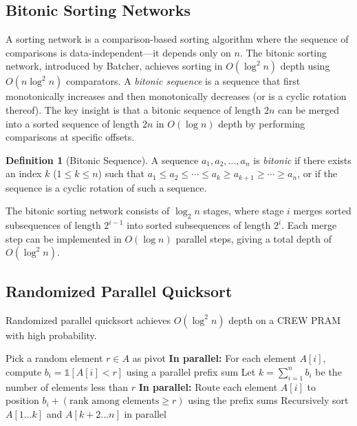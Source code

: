 \documentclass[twoside,12pt]{book}
\theoremstyle{plain}
\theoremstyle{definition}
\newtheorem{definition}[theorem]{Definition}
\theoremstyle{remark}
\begin{document}
\subsection{Bitonic Sorting Networks}
\label{subsec:bitonic}

A sorting network is a comparison-based sorting algorithm where the sequence of comparisons is data-independent---it depends only on $n$. The bitonic sorting network, introduced by Batcher, achieves sorting in $O(\log^2 n)$ depth using $O(n \log^2 n)$ comparators. A \emph{bitonic sequence} is a sequence that first monotonically increases and then monotonically decreases (or is a cyclic rotation thereof). The key insight is that a bitonic sequence of length $2n$ can be merged into a sorted sequence of length $2n$ in $O(\log n)$ depth by performing comparisons at specific offsets.

\begin{definition}[Bitonic Sequence]
\label{def:bitonic}
A sequence $a_1, a_2, \ldots, a_n$ is \emph{bitonic} if there exists an index $k$ ($1 \leq k \leq n$) such that $a_1 \leq a_2 \leq \cdots \leq a_k \geq a_{k+1} \geq \cdots \geq a_n$, or if the sequence is a cyclic rotation of such a sequence.
\end{definition}

The bitonic sorting network consists of $\log_2 n$ stages, where stage $i$ merges sorted subsequences of length $2^{i-1}$ into sorted subsequences of length $2^i$. Each merge step can be implemented in $O(\log n)$ parallel steps, giving a total depth of $O(\log^2 n)$.

\subsection{Randomized Parallel Quicksort}
\label{subsec:parallel-quicksort}

Randomized parallel quicksort achieves $O(\log^2 n)$ depth on a CREW PRAM with high probability.

\begin{algorithm}[H]
\caption{Randomized Parallel Quicksort}
\label{alg:parallel-quicksort}
\begin{algorithmic}[1]
\State Pick a random element $r \in A$ as pivot
\State \textbf{In parallel:} For each element $A[i]$, compute $b_i = \mathbb{1}[A[i] < r]$ using a parallel prefix sum
\State Let $k = \sum_{i=1}^{n} b_i$ be the number of elements less than $r$ 
\State \textbf{In parallel:} Route each element $A[i]$ to position $b_i + (\text{rank among elements} \geq r)$ using the prefix sums
\State Recursively sort $A[1 \ldots k]$ and $A[k+2 \ldots n]$ in parallel
\EndProcedure
\end{algorithmic}
\end{algorithm}
\end{document}
